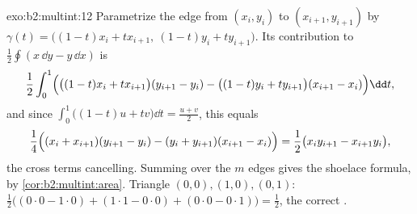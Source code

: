 \begin{solution}{exo:b2:multint:12}
Parametrize the edge from $(x_i, y_i)$ to $(x_{i+1}, y_{i+1})$
by $\gamma(t) = \bigl((1-t)x_i + tx_{i+1},\ (1-t)y_i +
ty_{i+1}\bigr)$. Its contribution to
$\frac12\oint(x\,\dd y - y\,\dd x)$ is
\[
\frac12\int_0^1\Bigl(\bigl((1-t)x_i +
tx_{i+1}\bigr)(y_{i+1} - y_i) - \bigl((1-t)y_i +
ty_{i+1}\bigr)(x_{i+1} - x_i)\Bigr)\dd t ,
\]
and since $\int_0^1\bigl((1-t)u + tv\bigr)\dd t = \frac{u +
v}2$, this equals
\[
\frac14\Bigl((x_i + x_{i+1})(y_{i+1} - y_i) - (y_i +
y_{i+1})(x_{i+1} - x_i)\Bigr)
= \frac12\bigl(x_iy_{i+1} - x_{i+1}y_i\bigr),
\]
the cross terms cancelling. Summing over the $m$ edges gives
the shoelace formula, by \cref{cor:b2:multint:area}. Triangle
$(0,0), (1,0), (0,1)$: $\frac12\bigl((0\cdot0 - 1\cdot0) +
(1\cdot1 - 0\cdot0) + (0\cdot0 - 0\cdot1)\bigr) = \frac12$,
the correct .
\end{solution}

